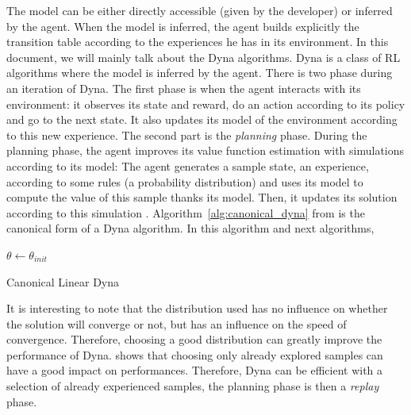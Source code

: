 \documentclass[]{article}
\begin{document}
The model can be either directly accessible (given by the developer) or inferred by the agent. When the model is inferred, the agent builds explicitly the transition table according to the experiences he has in its environment. In this document, we will mainly talk about the Dyna algorithms. Dyna is a class of RL algorithms where the model is inferred by the agent. There is two phase during an iteration of Dyna. The first phase is when the agent interacts with its environment: it observes its state and reward, do an action according to its policy and go to the next state. It also updates its model of the environment according to this new experience. The second part is the \emph{planning} phase. During the planning phase, the agent improves its value function estimation with simulations according to its model: The agent generates a sample state, an experience, according to some rules (a probability distribution) and uses its model to compute the value of this sample thanks its model. Then, it updates its solution according to this simulation \parencite{sutton_dyna-style_2012}. Algorithm~\ref{alg:canonical_dyna} from \textcite{sutton_dyna-style_2012} is the canonical form of a Dyna algorithm. In this algorithm and next algorithms,

\begin{algorithm}[htbp]
  \DontPrintSemicolon
  \SetAlgoNoLine
  \(\theta \gets \theta_{init}\)\;
  \caption{Canonical Linear Dyna \label{alg:canonical_dyna}}

\end{algorithm}

It is interesting to note that the distribution used has no influence on whether the solution will converge or not, but has an influence on the speed of convergence. Therefore, choosing a good distribution can greatly improve the performance of Dyna. \textcite{sutton_dyna-style_2012} shows that choosing only already explored samples can have a good impact on performances. Therefore, Dyna can be efficient with a selection of already experienced samples, the planning phase is then a \emph{replay} phase.
\end{document}
